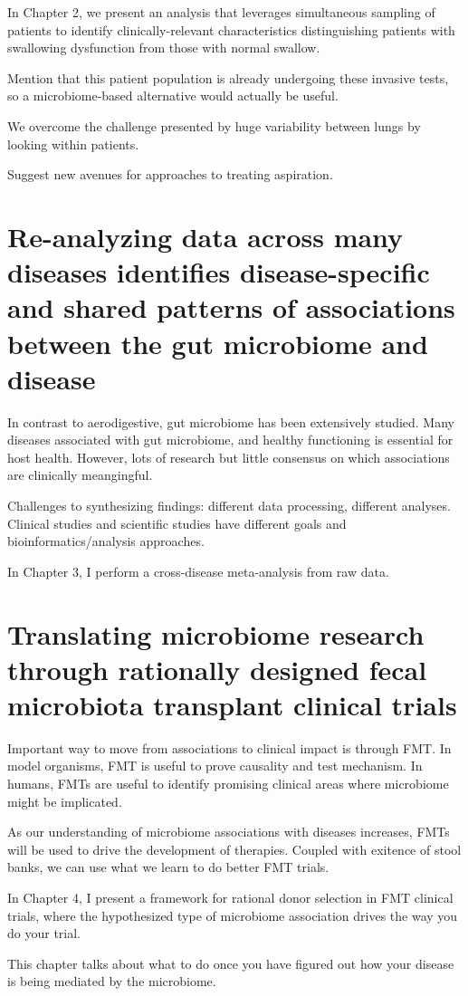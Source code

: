 In Chapter 2, we present an analysis that leverages simultaneous sampling of patients to identify clinically-relevant characteristics distinguishing patients with swallowing dysfunction from those with normal swallow.

Mention that this patient population is already undergoing these invasive tests, so a microbiome-based alternative would actually be useful.

We overcome the challenge presented by huge variability between lungs by looking within patients.

Suggest new avenues for approaches to treating aspiration.

\section{Re-analyzing data across many diseases identifies disease-specific and shared patterns of associations between the gut microbiome and disease}

In contrast to aerodigestive, gut microbiome has been extensively studied. Many diseases associated with gut microbiome, and healthy functioning is essential for host health. However, lots of research but little consensus on which associations are clinically meangingful.

Challenges to synthesizing findings: different data processing, different analyses. Clinical studies and scientific studies have different goals and bioinformatics/analysis approaches.

In Chapter 3, I perform a cross-disease meta-analysis from raw data.

\section{Translating microbiome research through rationally designed fecal microbiota transplant clinical trials}

Important way to move from associations to clinical impact is through FMT. In model organisms, FMT is useful to prove causality and test mechanism. In humans, FMTs are useful to identify promising clinical areas where microbiome might be implicated.

As our understanding of microbiome associations with diseases increases, FMTs will be used to drive the development of therapies. Coupled with exitence of stool banks, we can use what we learn to do better FMT trials.

In Chapter 4, I present a framework for rational donor selection in FMT clinical trials, where the hypothesized type of microbiome association drives the way you do your trial.

This chapter talks about what to do once you have figured out how your disease is being mediated by the microbiome.

\begin{singlespace}


\end{singlespace}
